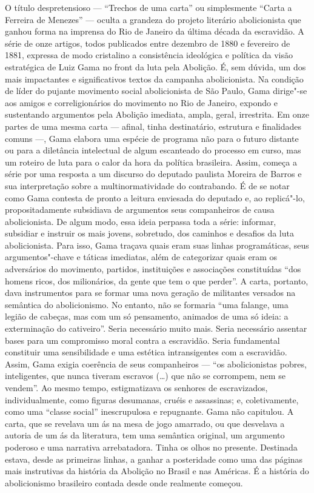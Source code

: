 {\small\noindent
O título despretensioso --- ``Trechos de uma carta'' ou simplesmente
``Carta a Ferreira de Menezes'' --- oculta a grandeza do projeto literário
abolicionista que ganhou forma na imprensa do Rio de Janeiro da última
década da escravidão. A série de onze artigos, todos publicados entre
dezembro de 1880 e fevereiro de 1881, expressa de modo cristalino a
consistência ideológica e política da visão estratégica de Luiz Gama no
front da luta pela Abolição. É, sem dúvida, um dos mais impactantes e
significativos textos da campanha abolicionista. Na condição de líder do
pujante movimento social abolicionista de São Paulo, Gama dirige"-se aos
amigos e correligionários do movimento no Rio de Janeiro, expondo e
sustentando argumentos pela Abolição imediata, ampla, geral, irrestrita.
Em onze partes de uma mesma carta --- afinal, tinha destinatário,
estrutura e finalidades comuns ---, Gama elabora uma espécie de programa
não para o futuro distante ou para a diletância intelectual de algum
escanteado do processo em curso, mas um roteiro de luta para o calor da
hora da política brasileira. Assim, começa a série por uma resposta a um
discurso do deputado paulista Moreira de Barros e sua interpretação
sobre a multinormatividade do contrabando. É de se notar como Gama
contesta de pronto a leitura enviesada do deputado e, ao replicá"-lo,
propositadamente subsidiava de argumentos seus companheiros de causa
abolicionista. De algum modo, essa
ideia perpassa toda a série: informar, subsidiar e instruir os mais
jovens, sobretudo, dos caminhos e desafios da luta abolicionista. Para
isso, Gama traçava quais eram suas linhas programáticas, seus
argumentos"-chave e táticas imediatas, além de categorizar quais eram os
adversários do movimento, partidos, instituições e associações
constituídas ``dos homens ricos, dos milionários, da gente que tem o que
perder''. A carta, portanto, dava instrumentos para se formar uma nova
geração de militantes versados na semântica do abolicionismo. No
entanto, não se formaria ``uma falange, uma legião de cabeças, mas com um
só pensamento, animados de uma só ideia: a exterminação do cativeiro''.
Seria necessário muito mais. Seria necessário assentar bases
para um compromisso moral contra a escravidão. Seria fundamental
constituir uma sensibilidade e uma estética intransigentes com a
escravidão. Assim, Gama exigia coerência de seus companheiros --- ``os
abolicionistas pobres, inteligentes, que nunca tiveram escravos (\ldots{})
que não se corrompem, nem se vendem''. Ao mesmo tempo, estigmatizava os senhores de
escravizados, individualmente, como figuras desumanas, cruéis e
assassinas; e, coletivamente, como uma ``classe social'' inescrupulosa e
repugnante. Gama não capitulou. A carta, que se revelava um ás na mesa
de jogo amarrado, ou que desvelava a autoria de um ás da
literatura, tem uma semântica original, um argumento poderoso e uma
narrativa arrebatadora. Tinha os olhos no presente. Destinada estava,
desde as primeiras linhas, a ganhar a posteridade como uma das páginas
mais instrutivas da história da Abolição no Brasil e nas Américas. É a
história do abolicionismo brasileiro contada desde onde realmente
começou. }
\@openrighttrue\makeatother \endgroup


